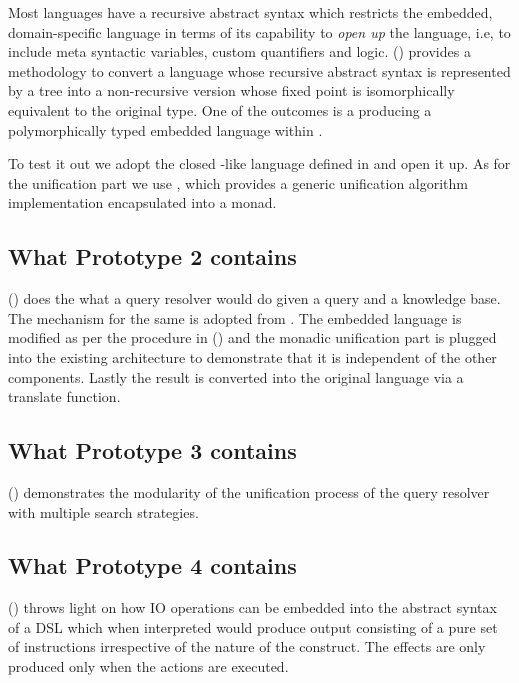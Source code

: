 \documentclass[thesis-solanki.tex]{subfiles}
\begin{document}
Most languages have a recursive abstract syntax which restricts the embedded, domain-specific language
  in terms of its capability to \textit{open up} the language, i.e, to include meta syntactic
  variables, custom quantifiers and logic.
  () provides a methodology to convert a language whose recursive abstract
  syntax is represented by a tree into a non-recursive version whose fixed point is isomorphically equivalent to
  the original type.
  One of the outcomes is a producing a polymorphically typed embedded language within .

  To test it out we adopt the closed -like language defined in \cite{prolog-lib} and open it up.
  As for the unification part we use \cite{unification-fd-lib}, which provides a generic unification algorithm
  implementation encapsulated into a monad.


\subsection{What Prototype 2 contains}

  () does the what a  query resolver would do given a
  query and a knowledge base.
  The mechanism for the same is adopted from \cite{prolog-lib}.
  The embedded language is modified as per the procedure in () and the
  monadic unification part is plugged into the existing architecture to demonstrate that it is independent of the
  other components.
  Lastly the result is converted into the original language via a translate function.

\subsection{What Prototype 3 contains}

  () demonstrates the modularity of the unification process of the query
  resolver with multiple search strategies.

\subsection{What Prototype 4 contains}

  () throws light on how IO operations can be embedded into the abstract
  syntax of a DSL which when interpreted would produce output consisting of a pure set of instructions irrespective
  of the nature of the construct.
  The effects are only produced only when the actions are executed.
\end{document}
